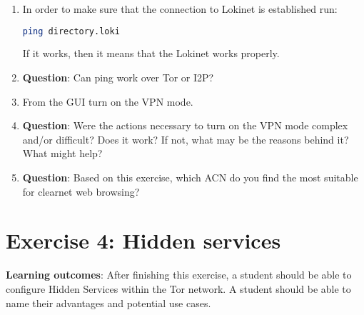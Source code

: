 \begin{enumerate}
    \item In order to make sure that the connection to Lokinet is established run:
    \begin{lstlisting}[language=bash]
    ping directory.loki
    \end{lstlisting}
    If it works, then it means that the Lokinet works properly.
    \item \textbf{Question}: Can ping work over Tor or I2P?
    \item From the GUI turn on the VPN mode.
    \item \textbf{Question}: Were the actions necessary to turn on the VPN mode complex and/or difficult? Does it work? If not, what may be the reasons behind it? What might help?
    \item \textbf{Question}: Based on this exercise, which ACN do you find the most suitable for clearnet web browsing?
\end{enumerate}


\section*{Exercise 4: Hidden services}
\textbf{Learning outcomes}: After finishing this exercise, a student should be able to configure Hidden Services within the Tor network. A student should be able to name their advantages and potential use cases.

